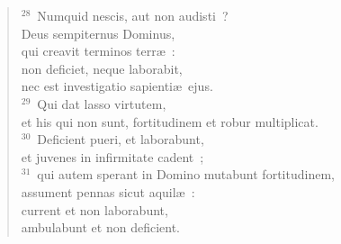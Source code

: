 \begin{flushleft}
\begin{verse}
${}^{28}$~Numquid nescis, aut non audisti~?\\ Deus sempiternus Dominus,\\ qui creavit terminos terr\ae~:\\ non deficiet, neque laborabit,\\ nec est investigatio sapienti\ae\ ejus.\\
${}^{29}$~Qui dat lasso virtutem,\\ et his qui non sunt, fortitudinem et robur multiplicat.\\
${}^{30}$~Deficient pueri, et laborabunt,\\ et juvenes in infirmitate cadent~;\\
${}^{31}$~qui autem sperant in Domino mutabunt fortitudinem,\\ assument pennas sicut aquil\ae~:\\ current et non laborabunt,\\ ambulabunt et non deficient.\end{verse}\end{flushleft}


